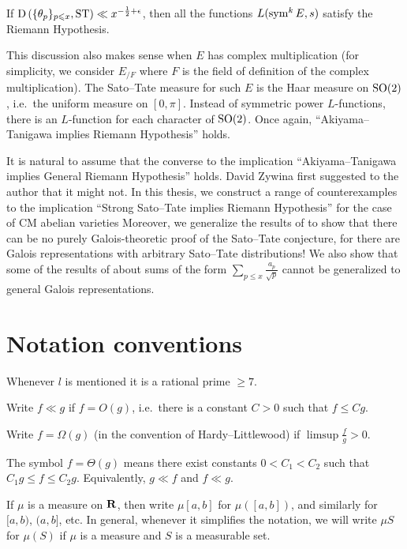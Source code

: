 \begin{theorem}[Mazur]
If $\operatorname{D}\left(\{\theta_p\}_{p\leqslant x},\mathrm{ST}\right)\ll x^{-\frac 1 2+\epsilon}$, 
then all the functions $L(\operatorname{sym}^k E, s)$ satisfy the Riemann Hypothesis. 
\end{theorem}

This discussion also makes sense when $E$ has complex multiplication (for 
simplicity, we consider $E_{/F}$ where $F$ is the field of definition of the 
complex multiplication). The Sato--Tate measure for such $E$ is the Haar 
measure on $\operatorname{SO}(2)$, i.e.~the uniform measure on $[0,\pi]$. Instead of 
symmetric power $L$-functions, there is an $L$-function for each character of 
$\operatorname{SO}(2)$. Once again, ``Akiyama--Tanigawa implies Riemann Hypothesis'' holds. 

It is natural to assume that the converse to the implication 
``Akiyama--Tanigawa implies General Riemann Hypothesis'' holds. David Zywina 
first suggested to the author that it might not. In this thesis, we construct a 
range of counterexamples to the implication ``Strong Sato--Tate implies 
Riemann Hypothesis'' for the case of CM abelian varieties Moreover, we 
generalize the results of \cite{pande-2011} to show that there can be no 
purely Galois-theoretic proof of the Sato--Tate conjecture, for there are 
Galois representations with arbitrary Sato--Tate distributions! We also show 
that some of the results of \cite{sarnak-2007} about sums of the form 
$\sum_{p\leqslant x} \frac{a_p}{\sqrt p}$ cannot be generalized to general 
Galois representations. 





\section{Notation conventions}

Whenever $l$ is mentioned it is a rational prime $\geqslant 7$. 

Write $f\ll g$ if $f = O(g)$, i.e.~there is a constant $C>0$ such that 
$f \leqslant C g$. 

Write $f=\Omega(g)$ (in the convention of Hardy--Littlewood) if 
$\limsup \frac f g > 0$. 

The symbol $f = \Theta(g)$ means there exist constants $0<C_1<C_2$ such that 
$C_1 g \leqslant f \leqslant C_2 g$. Equivalently, $g \ll f$ and $f \ll g$. 

If $\mu$ is a measure on $\mathbf{R}$, then write $\mu[a,b]$ for $\mu([a,b])$, and 
similarly for $[a,b)$, $(a,b]$, etc. In general, whenever it simplifies the 
notation, we will write $\mu S$ for $\mu(S)$ if $\mu$ is a measure and 
$S$ is a measurable set. 

